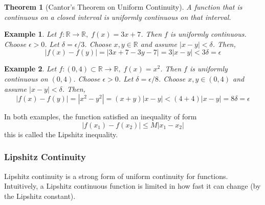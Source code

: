 \documentclass{article}
\newtheorem{theorem}{Theorem}[section]
\newtheorem{example}{Example}[section]
\theoremstyle{remark}
\theoremstyle{definition}
\begin{document}
\begin{theorem}[Cantor's Theorem on Uniform Continuity]
A function that is continuous on a closed interval is uniformly continuous on that interval. 
\end{theorem}


\begin{example}
Let $f: \mathbb{R} \longrightarrow \mathbb{R}, \; f(x) = 3x+7$. Then $f$ is uniformly continuous. Choose $\epsilon > 0$. Let $\delta = \epsilon / 3$. Choose $x, y \in \mathbb{R}$ and assume $|x-y| < \delta$. Then, 
\[ | f(x) - f(y) | = | 3x + 7 - 3 y - 7 | = 3 |x-y| < 3 \delta = \epsilon\]
\end{example}

\begin{example}
Let $f: (0, 4) \subset \mathbb{R} \longrightarrow \mathbb{R}, \; f(x) = x^2$. Then $f$ is uniformly continuous on $(0, 4)$. Choose $\epsilon > 0$. Let $\delta = \epsilon / 8$. Choose $x, y \in (0, 4)$ and assume $|x-y| < \delta$. Then, 
\[ |f(x) - f(y)| = |x^2 - y^2| = (x+y) |x-y| < (4+4) |x-y| = 8\delta = \epsilon\]
\end{example}

In both examples, the function satisfied an inequality of form 
\[ |f(x_1) - f(x_2)| \leq M |x_1 - x_2|\]
this is called the Lipshitz inequality. 

\subsubsection{Lipshitz Continuity}
Lipshitz continuity is a strong form of uniform continuity for functions. Intuitively, a Lipshitz continuous function is limited in how fast it can change (by the Lipshitz constant). 
\end{document}
